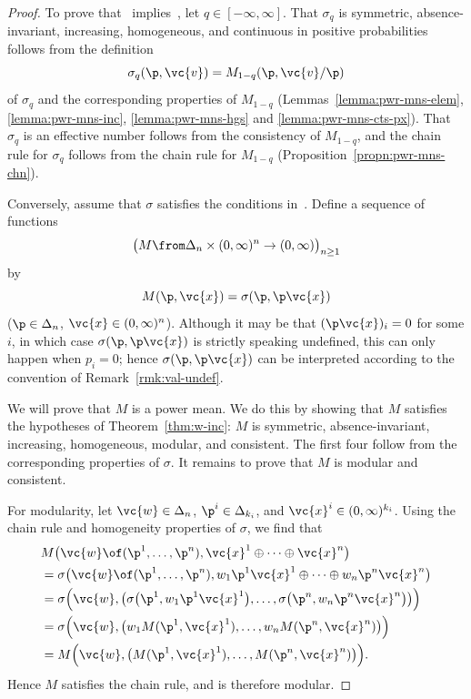 \begin{proof}
To prove that~
implies~, let $q \in [-\infty, \infty]$.  
That $\sigma_q$ is symmetric, absence-invariant, increasing, homogeneous, and
continuous in positive probabilities follows from
the definition
\[
\sigma_q(\p, \vc{v}) = M_{1 - q}(\p, \vc{v}/\p)
\]
of $\sigma_q$ and the corresponding properties of $M_{1 - q}$
(Lemmas~\ref{lemma:pwr-mns-elem}, \ref{lemma:pwr-mns-inc},
\ref{lemma:pwr-mns-hgs} and
\ref{lemma:pwr-mns-cts-px}).  That $\sigma_q$
is an effective number follows from the consistency of $M_{1 - q}$, and the
chain rule for $\sigma_q$ follows from the chain rule for $M_{1 - q}$
(Proposition~\ref{propn:pwr-mns-chn}).

Conversely, assume that $\sigma$ satisfies the conditions
in~.  Define a sequence of functions
\[
\bigl( 
M \from \Delta_n \times (0, \infty)^n \to (0, \infty) 
\bigr)_{n \geq 1}
\]
by 
\[
M(\p, \vc{x}) = \sigma(\p, \p\vc{x})
\]
($\p \in \Delta_n$, $\vc{x} \in (0, \infty)^n$).  Although it may be that
$(\p\vc{x})_i = 0$ for some $i$, in which case $\sigma(\p, \p\vc{x})$ is
strictly speaking undefined, this can only happen when $p_i = 0$; hence
$\sigma(\p, \p\vc{x})$ can be interpreted according to the convention of
Remark~\ref{rmk:val-undef}.

We will prove that $M$ is a power mean.  We do this by showing that $M$
satisfies the hypotheses of Theorem~\ref{thm:w-inc}: $M$ is symmetric,
absence-invariant, increasing, homogeneous, modular, and consistent.  The
first four follow from the corresponding properties of $\sigma$.
It remains to prove that $M$ is modular and consistent.

For modularity, let $\vc{w} \in \Delta_n$, $\p^i \in \Delta_{k_i}$, and
$\vc{x}^i \in (0, \infty)^{k_i}$.  Using the chain rule and
homogeneity properties of $\sigma$, we find that
% 
\begin{align*}
&
M\bigl( 
\vc{w} \of (\p^1, \ldots, \p^n), \vc{x}^1 \oplus\cdots\oplus \vc{x}^n
\bigr)  \\
&
=
\sigma\bigl(
\vc{w} \of (\p^1, \ldots, \p^n), 
w_1 \p^1 \vc{x}^1 \oplus\cdots\oplus w_n \p^n \vc{x}^n
\bigr)  \\
&
=
\sigma\Bigl(
\vc{w}, \bigl(
\sigma\bigl(\p^1, w_1 \p^1 \vc{x}^1\bigr), 
\ldots, 
\sigma\bigl(\p^n, w_n \p^n \vc{x}^n\bigr)
\bigr)
\Bigr)  \\
&
=
\sigma\Bigl(
\vc{w}, \bigl(
w_1 M(\p^1, \vc{x}^1), \ldots, w_n M(\p^n, \vc{x}^n)
\bigr)
\Bigr)  \\
&
=
M\Bigl(
\vc{w}, \bigl(
M(\p^1, \vc{x}^1), \ldots, M(\p^n, \vc{x}^n)
\bigr)
\Bigr).
\end{align*}
% 
Hence $M$ satisfies the chain rule, and is therefore modular.


\end{proof}

